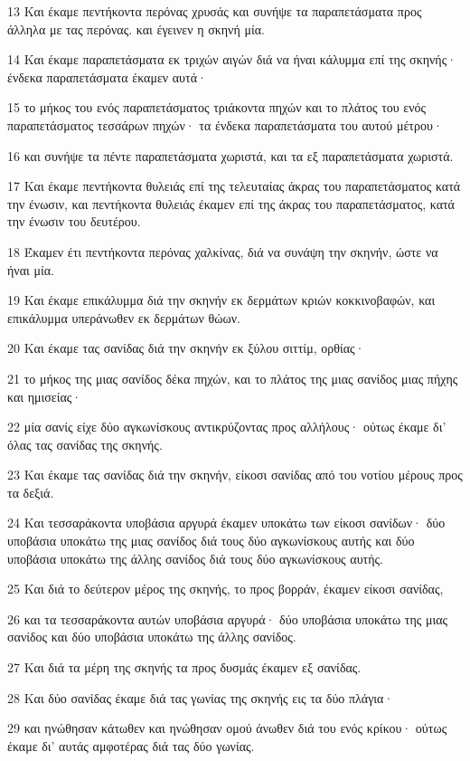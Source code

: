 \par 13 Και έκαμε πεντήκοντα περόνας χρυσάς και συνήψε τα παραπετάσματα προς άλληλα με τας περόνας. και έγεινεν η σκηνή μία.
\par 14 Και έκαμε παραπετάσματα εκ τριχών αιγών διά να ήναι κάλυμμα επί της σκηνής· ένδεκα παραπετάσματα έκαμεν αυτά·
\par 15 το μήκος του ενός παραπετάσματος τριάκοντα πηχών και το πλάτος του ενός παραπετάσματος τεσσάρων πηχών· τα ένδεκα παραπετάσματα του αυτού μέτρου·
\par 16 και συνήψε τα πέντε παραπετάσματα χωριστά, και τα εξ παραπετάσματα χωριστά.
\par 17 Και έκαμε πεντήκοντα θυλειάς επί της τελευταίας άκρας του παραπετάσματος κατά την ένωσιν, και πεντήκοντα θυλειάς έκαμεν επί της άκρας του παραπετάσματος, κατά την ένωσιν του δευτέρου.
\par 18 Έκαμεν έτι πεντήκοντα περόνας χαλκίνας, διά να συνάψη την σκηνήν, ώστε να ήναι μία.
\par 19 Και έκαμε επικάλυμμα διά την σκηνήν εκ δερμάτων κριών κοκκινοβαφών, και επικάλυμμα υπεράνωθεν εκ δερμάτων θώων.
\par 20 Και έκαμε τας σανίδας διά την σκηνήν εκ ξύλου σιττίμ, ορθίας·
\par 21 το μήκος της μιας σανίδος δέκα πηχών, και το πλάτος της μιας σανίδος μιας πήχης και ημισείας·
\par 22 μία σανίς είχε δύο αγκωνίσκους αντικρύζοντας προς αλλήλους· ούτως έκαμε δι' όλας τας σανίδας της σκηνής.
\par 23 Και έκαμε τας σανίδας διά την σκηνήν, είκοσι σανίδας από του νοτίου μέρους προς τα δεξιά.
\par 24 Και τεσσαράκοντα υποβάσια αργυρά έκαμεν υποκάτω των είκοσι σανίδων· δύο υποβάσια υποκάτω της μιας σανίδος διά τους δύο αγκωνίσκους αυτής και δύο υποβάσια υποκάτω της άλλης σανίδος διά τους δύο αγκωνίσκους αυτής.
\par 25 Και διά το δεύτερον μέρος της σκηνής, το προς βορράν, έκαμεν είκοσι σανίδας,
\par 26 και τα τεσσαράκοντα αυτών υποβάσια αργυρά· δύο υποβάσια υποκάτω της μιας σανίδος και δύο υποβάσια υποκάτω της άλλης σανίδος.
\par 27 Και διά τα μέρη της σκηνής τα προς δυσμάς έκαμεν εξ σανίδας.
\par 28 Και δύο σανίδας έκαμε διά τας γωνίας της σκηνής εις τα δύο πλάγια·
\par 29 και ηνώθησαν κάτωθεν και ηνώθησαν ομού άνωθεν διά του ενός κρίκου· ούτως έκαμε δι' αυτάς αμφοτέρας διά τας δύο γωνίας.
